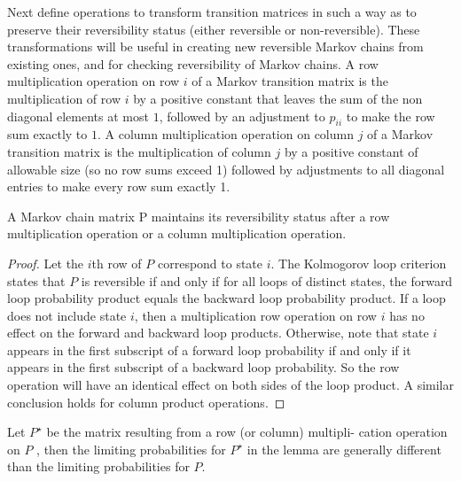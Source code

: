 \documentclass[12pt]{article}
\begin{document}
Next define operations to transform transition matrices in such a way as to
preserve their reversibility status (either reversible or
non-reversible). These
transformations will be useful in creating new reversible Markov chains from existing
ones, and for checking reversibility of Markov chains.
A row multiplication operation on row $i$ of a Markov transition
matrix is the multiplication of row $i$ by a positive constant that leaves the sum
of the non diagonal elements at most $1$, followed by an adjustment to $p_{ii}$ to make
the row sum exactly to $1$.
A column multiplication operation on column $j$ of a Markov transition matrix is the multiplication of column $j$ by a positive constant of allowable
size (so no row sums exceed 1) followed by adjustments to all diagonal entries to
make every row sum exactly 1.

\begin{lemma}
  A Markov chain matrix P maintains its reversibility status after
a row multiplication operation or a column multiplication operation.
\end{lemma}

\begin{proof}
  Let the $i$th row of $P$ correspond to state $i$. The Kolmogorov
  loop criterion states
that $P$ is reversible if and only if for all loops of distinct states, the forward loop probability
product equals the backward loop probability product. If a loop does not include
state $i$, then a multiplication row operation on row $i$ has no effect on
the forward
and backward loop products. Otherwise, note that state $i$ appears in the first
subscript of a forward loop probability if and only if it appears in the first subscript of a
backward loop probability. So the row operation will have an identical effect on
both sides of the loop product. A similar conclusion holds for column product
operations.
\end{proof}

\begin{remark}
  Let $P^{\star}$ be the matrix resulting from a row (or column) multipli-
cation operation on $P$ , then the limiting probabilities for $P^{\star}$ in the lemma
are generally different than the limiting probabilities for $P$. 
\end{remark}
\end{document}
